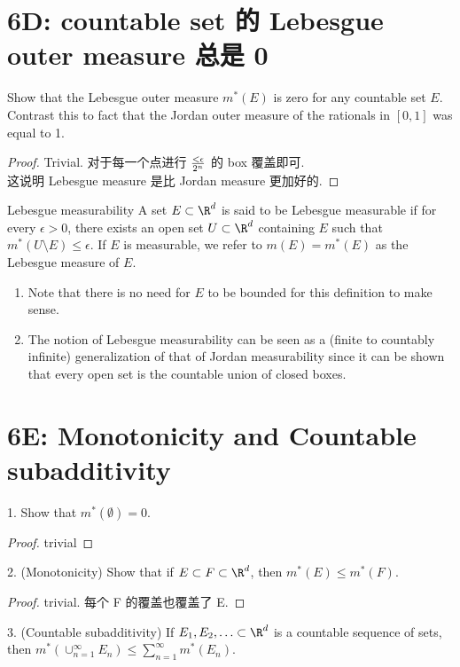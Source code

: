 \documentclass[lang=cn,11pt]{template}
\begin{document}
\section*{6D: countable set 的 Lebesgue outer measure 总是 0}
Show that the Lebesgue outer measure $m^*(E)$ is zero for any countable set $E$. Contrast this to fact that the Jordan outer measure of the rationals in $[0,1]$ was equal to 1.
\begin{proof}
    Trivial. 对于每一个点进行 $ < \epsilon \over {2^n}$ 的 box 覆盖即可. \\
    这说明 Lebesgue measure 是比 Jordan measure 更加好的.
\end{proof}


\begin{definition}{Lebesgue measurability}
A set $E\subset \R^d$ is said to be Lebesgue measurable if for every $\epsilon>0$, there exists an open set $U\subset \R^d$ containing $E$ such that $m^*(U\setminus E)\leq \epsilon$. If $E$ is measurable, we refer to $m(E)=m^*(E)$ as the Lebesgue measure of $E$. 
\end{definition}

\begin{remark}
    \begin{enumerate} 
\item Note that there is no need for $E$ to be bounded for this definition to make sense. 
\item The notion of Lebesgue measurability can be seen as a (finite to countably infinite) generalization of that of Jordan measurability since it can be shown that every open set is the countable union of closed boxes.  
\end{enumerate}
\end{remark}


\section*{6E: Monotonicity and Countable subadditivity}
1. Show that $m^*(\emptyset)=0$.
\begin{proof}
    trivial
\end{proof}
2. (Monotonicity) Show that if $E\subset F\subset \R^d$, then $m^*(E) \leq m^*(F)$.
\begin{proof}
    trivial. 每个 F 的覆盖也覆盖了 E.
\end{proof}
3. (Countable subadditivity) If $E_1, E_2, \ldots \subset \R^d$ is a countable sequence of sets, then $m^*\left(\cup_{n=1}^\infty E_n\right)\leq \sum_{n=1}^\infty m^*(E_n)$. 
\end{document}
